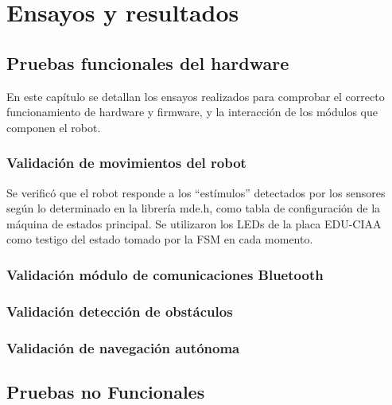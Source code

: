 
\chapter{Ensayos y resultados} %

\label{Chapter4} %


\section{Pruebas funcionales del hardware}
\label{sec:pruebasHW}

En este capítulo se detallan los ensayos realizados para comprobar el correcto funcionamiento de hardware y firmware, y la interacción de los módulos que componen el robot.

\subsection{Validación de movimientos del robot}
Se verificó que el robot responde a los “estímulos” detectados por los sensores según lo determinado en la librería mde.h, como tabla de configuración de la máquina de estados principal. Se utilizaron los LEDs de la placa EDU-CIAA como testigo del estado tomado por la FSM en cada momento. 

\subsection{Validación módulo de comunicaciones Bluetooth}
\subsection{Validación detección de obstáculos}
\subsection{Validación de navegación autónoma}


\section{Pruebas no Funcionales}
